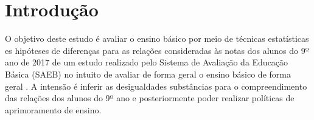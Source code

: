 
\chapter*[Introdução]{Introdução}

O objetivo deste estudo é avaliar o ensino básico por meio de técnicas estatísticas es hipóteses de diferenças para as relações consideradas às notas dos alunos do 9º ano de 2017 de um estudo realizado pelo Sistema de Avaliação da Educação Básica (SAEB) no intuito de avaliar de forma geral o ensino básico de forma geral \cite{Saeb2017a)}. A intensão é inferir as desigualdades substâncias para o compreendimento das relações dos alunos do 9º ano e posteriormente poder realizar políticas de aprimoramento de ensino.
